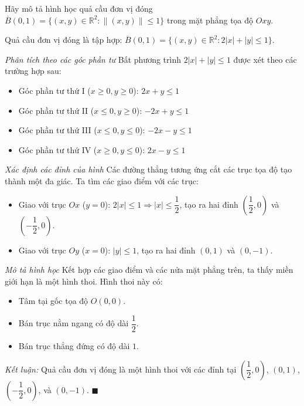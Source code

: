 \begin{questionbox}
Hãy mô tả hình học quả cầu đơn vị đóng $\overline{B}(0, 1) = \{ (x, y) \in \mathbb{R}^2 : \|(x, y)\| \leq 1 \}$ trong mặt phẳng tọa độ $Oxy$.
\end{questionbox}

\begin{solution}
Quả cầu đơn vị đóng là tập hợp: $\overline{B}(0,1) = \{(x,y) \in \mathbb{R}^2 : 2|x| + |y| \leq 1\}$.

\textit{Phân tích theo các góc phần tư}
Bất phương trình $2|x| + |y| \leq 1$ được xét theo các trường hợp sau:
\begin{itemize}
    \item Góc phần tư thứ I ($x \geq 0, y \geq 0$): $2x + y \leq 1$
    \item Góc phần tư thứ II ($x \leq 0, y \geq 0$): $-2x + y \leq 1$
    \item Góc phần tư thứ III ($x \leq 0, y \leq 0$): $-2x - y \leq 1$
    \item Góc phần tư thứ IV ($x \geq 0, y \leq 0$): $2x - y \leq 1$
\end{itemize}

\textit{Xác định các đỉnh của hình}
Các đường thẳng tương ứng cắt các trục tọa độ tạo thành một đa giác. Ta tìm các giao điểm với các trục:
\begin{itemize}
    \item Giao với trục $Ox$ ($y = 0$): $2|x| \leq 1 \Rightarrow |x| \leq \dfrac{1}{2}$, tạo ra hai đỉnh $\left(\dfrac{1}{2}, 0\right)$ và $\left(-\dfrac{1}{2}, 0\right)$.
    \item Giao với trục $Oy$ ($x = 0$): $|y| \leq 1$, tạo ra hai đỉnh $(0, 1)$ và $(0, -1)$.
\end{itemize}

\textit{Mô tả hình học}
Kết hợp các giao điểm và các nửa mặt phẳng trên, ta thấy miền giới hạn là một hình thoi.
Hình thoi này có:
\begin{itemize}
    \item Tâm tại gốc tọa độ $O(0,0)$.
    \item Bán trục nằm ngang có độ dài $\dfrac{1}{2}$.
    \item Bán trục thẳng đứng có độ dài $1$.
\end{itemize}

\textit{Kết luận:} Quả cầu đơn vị đóng là một hình thoi với các đỉnh tại $\left(\dfrac{1}{2}, 0\right)$, $(0, 1)$, $\left(-\dfrac{1}{2}, 0\right)$, và $(0, -1)$. $\blacksquare$
\end{solution}


